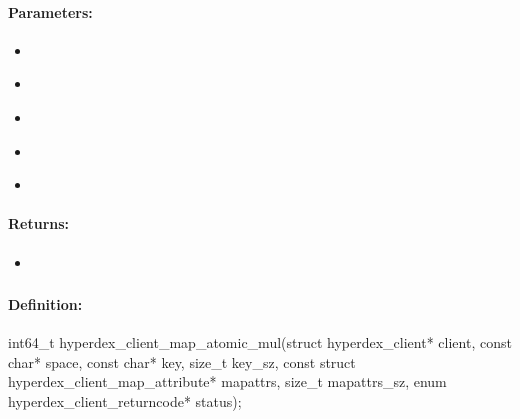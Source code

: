 \paragraph{Parameters:}
\begin{itemize}[noitemsep]
\item {}\\

\item {}\\

\item {}\\

\item {}\\

\item {}\\

\end{itemize}

\paragraph{Returns:}
\begin{itemize}[noitemsep]
\item {}\\

\end{itemize}

\pagebreak
\subsubsection{}
\label{api:c:map_atomic_mul}


\paragraph{Definition:}
\begin{ccode}
int64_t hyperdex_client_map_atomic_mul(struct hyperdex_client* client,
        const char* space,
        const char* key, size_t key_sz,
        const struct hyperdex_client_map_attribute* mapattrs, size_t mapattrs_sz,
        enum hyperdex_client_returncode* status);
\end{ccode}

